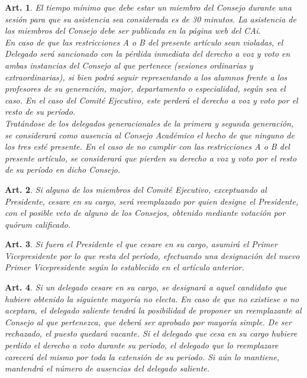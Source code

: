 \documentclass[letterpaper,11pt]{article}
\theoremstyle{plain}
\newtheorem{art}{Art.} %
\begin{document}
\begin{art}
			El tiempo mínimo que debe estar un miembro del Consejo durante una sesión para que su asistencia sea considerada es de 30 minutos. La asistencia de los miembros del Consejo debe ser publicada en la página web del CAi.\\
			En caso de que las restricciones A o B del presente artículo sean violadas, el Delegado será sancionado con la pérdida inmediata del derecho a voz y voto en ambas instancias del Consejo al que pertenece (sesiones ordinarias y extraordinarias), si bien podrá seguir representando a los alumnos frente a los profesores de su generación, major, departamento o especialidad, según sea el caso. En el caso del Comité Ejecutivo, este perderá el derecho a voz y voto por el resto de su período.\\
			Tratándose de los delegados generacionales de la primera y segunda generación, se considerará como ausencia al Consejo Académico el hecho de que ninguno de los tres esté presente. En el caso de no cumplir con las restricciones A o B del presente artículo, se considerará que pierden su derecho a voz y voto por el resto de su período en dicho Consejo.
		\end{art}

		\begin{art}\label{ceseCargoEjecutivo}
			Si alguno de los miembros del Comité Ejecutivo, exceptuando al Presidente, cesare en su cargo, será reemplazado por quien designe el Presidente, con el posible veto de alguno de los Consejos, obtenido mediante votación por quórum calificado.
		\end{art}

		\begin{art}\label{ceseCargoPresidente}
			Si fuera el Presidente el que cesare en su cargo, asumirá el Primer Vicepresidente por lo que resta del período, efectuando una designación del nuevo Primer Vicepresidente según lo establecido en el artículo anterior.
		\end{art}

		\begin{art}\label{reemplazoDelegados}
			Si un delegado cesare en su cargo, se designará a aquel candidato que hubiere obtenido la siguiente mayoría no electa. En caso de que no existiese o no aceptara, el delegado saliente tendrá la posibilidad de proponer un reemplazante al Consejo al que pertenezca, que deberá ser aprobado por mayoría simple. De ser rechazado, el puesto quedará vacante. Si el delegado que cesa en su cargo hubiere perdido el derecho a voto durante su periodo, el delegado que lo reemplazare carecerá del mismo por toda la extensión de su periodo. Si aún lo mantiene, mantendrá el número de ausencias del delegado saliente.
		\end{art}
\end{document}
